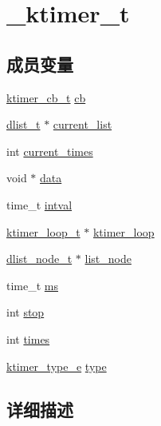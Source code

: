 \hypertarget{struct__ktimer__t}{}\section{\+\_\+ktimer\+\_\+t}
\label{struct__ktimer__t}
\subsection*{成员变量}
\begin{DoxyCompactItemize}
\item 
\hyperlink{config_8h_a2333fd0f2c3a85faf586300ca40deed4}{ktimer\+\_\+cb\+\_\+t} \hyperlink{struct__ktimer__t_a4009fd19bb25e5ed5e9b971db1d62a98}{cb}
\item 
\hyperlink{config_8h_ad6644d67df4b4e3596c1eb12977d1d16}{dlist\+\_\+t} $\ast$ \hyperlink{struct__ktimer__t_a8621a5cdd71a0fb2a93c75ad076f43af}{current\+\_\+list}
\item 
int \hyperlink{struct__ktimer__t_a3ac569d3fe93e34db02d334b0515146e}{current\+\_\+times}
\item 
void $\ast$ \hyperlink{struct__ktimer__t_a735984d41155bc1032e09bece8f8d66d}{data}
\item 
time\+\_\+t \hyperlink{struct__ktimer__t_ac51a900086331031163d965952207477}{intval}
\item 
\hyperlink{config_8h_a024af2aa29615e7a811ea6c45438157d}{ktimer\+\_\+loop\+\_\+t} $\ast$ \hyperlink{struct__ktimer__t_afecd1f25004f7b34c54195e15b9b6f26}{ktimer\+\_\+loop}
\item 
\hyperlink{config_8h_a62053232bcf3566010ef98a7d77c3cc8}{dlist\+\_\+node\+\_\+t} $\ast$ \hyperlink{struct__ktimer__t_a1077e5b0269760e53b61c2d62c5ae6a3}{list\+\_\+node}
\item 
time\+\_\+t \hyperlink{struct__ktimer__t_ac00f09be782cfb10bb1b179c189ad18b}{ms}
\item 
int \hyperlink{struct__ktimer__t_a6c0af9f2e97842405fb15ed952ef2976}{stop}
\item 
int \hyperlink{struct__ktimer__t_aad4f4c24ba75d1526ad9a49089a2d067}{times}
\item 
\hyperlink{config_8h_a42e924130e6eb3bd995344f6d3f3e918}{ktimer\+\_\+type\+\_\+e} \hyperlink{struct__ktimer__t_aa889e3eed3259dbe68bac4c2887fd912}{type}
\end{DoxyCompactItemize}


\subsection{详细描述}


